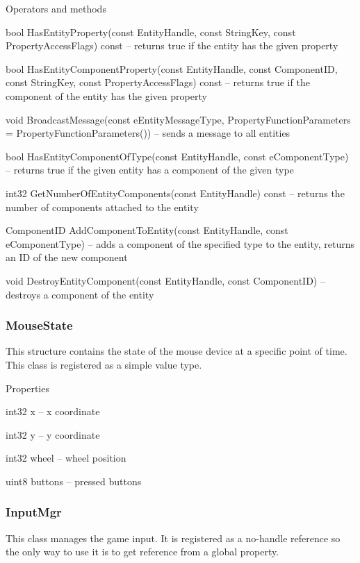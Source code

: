 \begin{titled-itemize}{Operators and methods}
  \item bool HasEntityProperty(const EntityHandle, const StringKey, const PropertyAccessFlags) const -- returns true if the entity has the given property
  \item bool HasEntityComponentProperty(const EntityHandle, const ComponentID, const StringKey, const PropertyAccessFlags) const -- returns true if the component of the entity has the given property
  \item void BroadcastMessage(const eEntityMessageType, PropertyFunctionParameters = PropertyFunctionParameters()) -- sends a message to all entities
  \item bool HasEntityComponentOfType(const EntityHandle, const eComponentType) -- returns true if the given entity has a component of the given type
  \item int32 GetNumberOfEntityComponents(const EntityHandle) const -- returns the number of components attached to the entity
  \item ComponentID AddComponentToEntity(const EntityHandle, const e\-Com\-po\-nent\-Ty\-pe) -- adds a component of the specified type to the entity, returns an ID of the new component
  \item void DestroyEntityComponent(const EntityHandle, const Com\-po\-nent\-ID) -- destroys a component of the entity
\end{titled-itemize}

\subsubsection{MouseState}

This structure contains the state of the mouse device at a specific point of time. This class is registered as a simple value type.

\begin{titled-itemize}{Properties}
  \item int32 x -- x coordinate
  \item int32 y -- y coordinate
  \item int32 wheel -- wheel position
  \item uint8 buttons -- pressed buttons
\end{titled-itemize}

\subsubsection{InputMgr}

This class manages the game input. It is registered as a no-handle reference so the only way to use it is to get reference from a global property.

